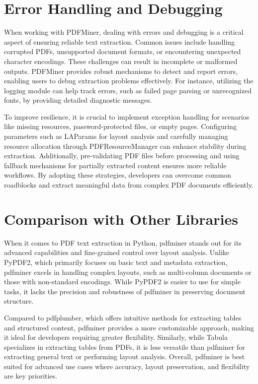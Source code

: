\section{Error Handling and Debugging}

When working with PDFMiner, dealing with errors and debugging is a critical aspect of ensuring reliable text extraction. Common issues include handling corrupted PDFs, unsupported document formats, or encountering unexpected character encodings. These challenges can result in incomplete or malformed outputs. PDFMiner provides robust mechanisms to detect and report errors, enabling users to debug extraction problems effectively. For instance, utilizing the logging module can help track errors, such as failed page parsing or unrecognized fonts, by providing detailed diagnostic messages.\cite{Shinyama:2019}

To improve resilience, it is crucial to implement exception handling for scenarios like missing resources, password-protected files, or empty pages. Configuring parameters such as LAParams for layout analysis and carefully managing resource allocation through PDFResourceManager can enhance stability during extraction. Additionally, pre-validating PDF files before processing and using fallback mechanisms for partially extracted content ensures more reliable workflows. By adopting these strategies, developers can overcome common roadblocks and extract meaningful data from complex PDF documents efficiently.\cite{Bernhardt:2022}

\section{Comparison with Other Libraries}

When it comes to PDF text extraction in Python, pdfminer stands out for its advanced capabilities and fine-grained control over layout analysis. Unlike PyPDF2, which primarily focuses on basic text and metadata extraction, pdfminer excels in handling complex layouts, such as multi-column documents or those with non-standard encodings. While PyPDF2 is easier to use for simple tasks, it lacks the precision and robustness of pdfminer in preserving document structure.

Compared to pdfplumber, which offers intuitive methods for extracting tables and structured content, pdfminer provides a more customizable approach, making it ideal for developers requiring greater flexibility. Similarly, while Tabula specializes in extracting tables from PDFs, it is less versatile than pdfminer for extracting general text or performing layout analysis. Overall, pdfminer is best suited for advanced use cases where accuracy, layout preservation, and flexibility are key priorities. \cite{Shinyama:2019}

